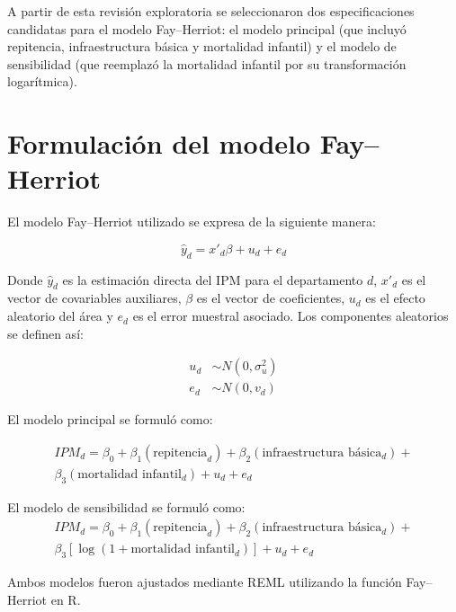 A partir de esta revisión exploratoria se seleccionaron dos especificaciones candidatas para el modelo Fay–Herriot: el modelo principal (que incluyó repitencia, infraestructura básica y mortalidad infantil) y el modelo de sensibilidad (que reemplazó la mortalidad infantil por su transformación logarítmica).

\section{Formulación del modelo Fay–Herriot}
El modelo Fay–Herriot utilizado se expresa de la siguiente manera:

\begin{equation}
    \hat{y}_d = x'_d \beta + u_d + e_d
\end{equation}

Donde $\hat{y}_d$ es la estimación directa del IPM para el departamento $d$, $x'_d$ es el vector de covariables auxiliares, $\beta$ es el vector de coeficientes, $u_d$ es el efecto aleatorio del área y $e_d$ es el error muestral asociado. Los componentes aleatorios se definen así:

\begin{align}
    u_d &\sim N(0, \sigma^2_u) \\
    e_d &\sim N(0, v_d)
\end{align}

El modelo principal se formuló como:

\begin{equation}
    \begin{split}
        IPM_d = \beta_0 + \beta_1(\text{repitencia}_d) + \beta_2(\text{infraestructura básica}_d) + \\
        \beta_3(\text{mortalidad infantil}_d) + u_d + e_d
    \end{split}
\end{equation}

El modelo de sensibilidad se formuló como:
\begin{equation}
    \begin{split}
        IPM_d = \beta_0 + \beta_1(\text{repitencia}_d) + \beta_2(\text{infraestructura básica}_d) + \\
        \beta_3[\log(1 + \text{mortalidad infantil}_d)] + u_d + e_d
    \end{split}
\end{equation}

Ambos modelos fueron ajustados mediante REML utilizando la función Fay–Herriot en R.

